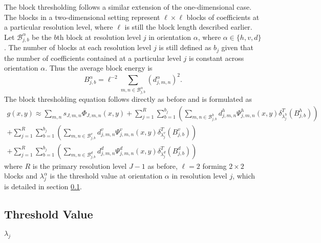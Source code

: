 \documentclass[a4paper, 12pt]{article}
\begin{document}
\medskip
The block thresholding follows a similar extension of the one-dimensional case. The blocks in a two-dimensional setting represent $\ell \times \ell$ blocks of coefficients at a particular resolution level, where $\ell$ is still the block length described earlier. Let $\mathcal{B}^{\alpha}_{j,b}$ be the $b$th block at resolution level $j$ in orientation $\alpha$, where $\alpha \in \{h,v,d\}$. The number of blocks at each resolution level $j$ is still defined as $b_{j}$ given that the number of coefficients contained at a particular level $j$ is constant across orientation $\alpha$. Thus the average block energy is
\begin{equation}
B^{\alpha}_{j,b} = \ell ^{-2} \sum\limits_{m,n \in \mathcal{B}^{\alpha}_{j,b}} (d^{\alpha}_{j,m,n})^{2}.
\label{eq:blockenergy2d}
\end{equation}
The block thresholding equation follows directly as before and is formulated as
\begin{equation}
\begin{split}
g(x,y) \approx \sum\limits_{m,n} s_{J,m,n} \Phi_{J,m,n}(x,y) + \sum\limits^{R}_{j = 1} \sum\limits^{b_{j}}_{b = 1} \left(  \sum\limits_{m,n \in \mathcal{B}^{h}_{j,b}} d^{h}_{j,m,n} \Psi^{h}_{j,m,n}(x,y) \delta^{T}_{\lambda^{h}_{j}}(B^{h}_{j,b}) \right) \\
+ \sum\limits^{R}_{j = 1} \sum\limits^{b_{j}}_{b = 1} \left(  \sum\limits_{m,n \in \mathcal{B}^{v}_{j,b}} d^{v}_{j,m,n} \Psi^{v}_{j,m,n}(x,y) \delta^{T}_{\lambda^{v}_{j}}(B^{v}_{j,b}) \right) \\
+ \sum\limits^{R}_{j = 1} \sum\limits^{b_{j}}_{b = 1} \left(  \sum\limits_{m,n \in \mathcal{B}^{d}_{j,b}} d^{d}_{j,m,n} \Psi^{d}_{j,m,n}(x,y) \delta^{T}_{\lambda^{d}_{j}}(B^{d}_{j,b}) \right)
\end{split}
\label{eq:block2d}
\end{equation}
where $R$ is the primary resolution level $J - 1$ as before, $\ell = 2$ forming $2 \times 2$ blocks and $\lambda^{\alpha}_{j}$ is the threshold value at orientation $\alpha$ in resolution level $j$, which is detailed in section \ref{sec:lambda}. 

\subsection{Threshold Value}\label{sec:lambda}
\textbf{$\lambda_{j}$}

\newpage
\end{document}
